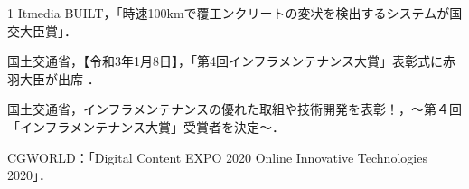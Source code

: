 \begin{報道}{1}
Itmedia BUILT，「時速100kmで覆工ンクリートの変状を検出するシステムが国交大臣賞」．
 
国土交通省，【令和3年1月8日】，「第4回インフラメンテナンス大賞」表彰式に赤羽大臣が出席 ．

国土交通省，インフラメンテナンスの優れた取組や技術開発を表彰！，～第４回「インフラメンテナンス大賞」受賞者を決定～．　

CGWORLD：「Digital Content EXPO 2020 Online Innovative Technologies 2020」．

\end{報道}




